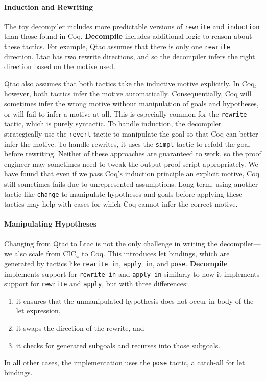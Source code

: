 \paragraph{Induction and Rewriting}
The toy decompiler includes more predictable versions of \lstinline{rewrite} and \lstinline{induction}
than those found in Coq. \textbf{Decompile} includes additional logic to reason about these tactics.
For example, Qtac assumes that there is only one \lstinline{rewrite} direction. Ltac has two rewrite directions,
and so the decompiler infers the right direction based on the motive used.

Qtac also assumes that both tactics take the inductive motive explicitly.
In Coq, however, both tactics infer the motive automatically.
Consequentially, Coq will sometimes infer the wrong motive without manipulation of goals and hypotheses,
or will fail to infer a motive at all.
This is especially common for the \lstinline{rewrite} tactic, which is purely syntactic.
To handle induction, the decompiler strategically use the \lstinline{revert} tactic to manipulate the goal
so that Coq can better infer the motive.
To handle rewrites, it uses the \lstinline{simpl} tactic to refold the goal before rewriting.
Neither of these approaches are guaranteed to work, so the proof engineer may sometimes need to tweak the output proof script appropriately.
We have found that even if we pass Coq's induction principle an explicit motive, Coq still sometimes fails due
to unrepresented assumptions.
Long term, using another tactic like \lstinline{change} to manipulate hypotheses and goals before applying these tactics
may help with cases for which Coq cannot infer the correct motive.

\paragraph{Manipulating Hypotheses}
Changing from Qtac to Ltac is not the only challenge in writing the decompiler---we also scale from CIC$_{\omega}$ to Coq.
This introduces let bindings, which are generated by tactics like \lstinline{rewrite in}, \lstinline{apply in}, and \lstinline{pose}.
\textbf{Decompile} implements support for \lstinline{rewrite in} and \lstinline{apply in} similarly to how it implements support for
\lstinline{rewrite} and \lstinline{apply}, but with three differences:

\begin{enumerate}
\item it ensures that the unmanipulated hypothesis does not occur in body of the let expression,
\item it swaps the direction of the rewrite, and
\item it checks for generated subgoals and recurses into those subgoals.
\end{enumerate}
In all other cases, the implementation uses the \lstinline{pose} tactic, a catch-all for let bindings.

